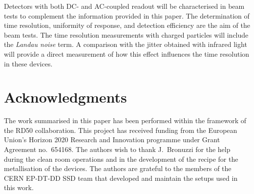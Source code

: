 \documentclass{article}
\begin{document}
Detectors with both DC- and AC-coupled readout will be characterised in beam tests to complement the information provided in this paper.
The determination of time resolution, uniformity of response, and detection efficiency are the aim of the beam tests.
The time resolution measurements with charged particles will include the \textit{Landau noise} term.
A comparison with the jitter obtained with infrared light will provide a direct measurement of how this effect influences the time resolution in these devices.

\section*{Acknowledgments}

The work summarised in this paper has been performed within the framework of the RD50 collaboration.
This project has received funding from the European Union’s Horizon 2020 Research and Innovation programme under Grant Agreement no.\ 654168.
The authors wish to thank J.~Bronuzzi for the help during the clean room operations and in the development of the recipe for the metallisation of the devices.
The authors are grateful to the members of the CERN EP-DT-DD SSD team that developed and maintain the setups used in this work.


%

\end{document}
